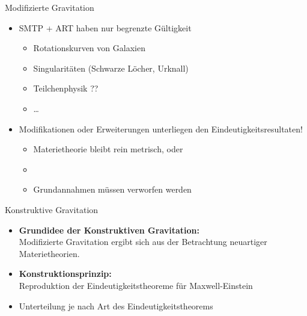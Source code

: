 \documentclass{beamer}
\begin{document}
    \begin{frame}{Modifizierte Gravitation}
        \begin{itemize}
            \item<1-> SMTP + ART haben nur begrenzte Gültigkeit
            \begin{itemize}
                \item<2-> Rotationskurven von Galaxien
                \item<3-> Singularitäten (Schwarze Löcher, Urknall)
                \item<4-> Teilchenphysik ??
                \item<5-> \ldots
            \end{itemize}
            \item<6-> Modifikationen oder Erweiterungen unterliegen den Eindeutigkeitsresultaten!
            \begin{itemize}
                \item<7-> Materietheorie bleibt rein metrisch, oder
                \item<8-> \alert{}
                \item<9-> Grundannahmen müssen verworfen werden
            \end{itemize}
        \end{itemize}
    \end{frame}

    \begin{frame}{Konstruktive Gravitation}
        \begin{itemize}
            \item \textbf{Grundidee der Konstruktiven Gravitation:} \\
            Modifizierte Gravitation ergibt sich aus der Betrachtung neuartiger Materietheorien. \pause
            \item \textbf{Konstruktionsprinzip:} \\
            Reproduktion der Eindeutigkeitstheoreme für Maxwell-Einstein \pause
            \item Unterteilung je nach Art des Eindeutigkeitstheorems
        \end{itemize}
    \end{frame}
\end{document}
